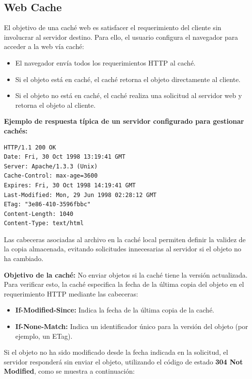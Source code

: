 \documentclass[a4paper,12pt]{article}
\begin{document}
\subsection{Web Cache}

El objetivo de una caché web es satisfacer el requerimiento del cliente sin involucrar al servidor destino. Para ello, el usuario configura el navegador para acceder a la web vía caché:

\begin{itemize}
    \item El navegador envía todos los requerimientos HTTP al caché.
    \item Si el objeto está en caché, el caché retorna el objeto directamente al cliente.
    \item Si el objeto no está en caché, el caché realiza una solicitud al servidor web y retorna el objeto al cliente.
\end{itemize}

\textbf{Ejemplo de respuesta típica de un servidor configurado para gestionar cachés:}

\begin{verbatim}
HTTP/1.1 200 OK
Date: Fri, 30 Oct 1998 13:19:41 GMT
Server: Apache/1.3.3 (Unix)
Cache-Control: max-age=3600
Expires: Fri, 30 Oct 1998 14:19:41 GMT
Last-Modified: Mon, 29 Jun 1998 02:28:12 GMT
ETag: "3e86-410-3596fbbc"
Content-Length: 1040
Content-Type: text/html
\end{verbatim}

Las cabeceras asociadas al archivo en la caché local permiten definir la validez de la copia almacenada, evitando solicitudes innecesarias al servidor si el objeto no ha cambiado.

\textbf{Objetivo de la caché:} No enviar objetos si la caché tiene la versión actualizada. Para verificar esto, la caché especifica la fecha de la última copia del objeto en el requerimiento HTTP mediante las cabeceras:

\begin{itemize}
    \item \textbf{If-Modified-Since:} Indica la fecha de la última copia de la caché.
    \item \textbf{If-None-Match:} Indica un identificador único para la versión del objeto (por ejemplo, un ETag).
\end{itemize}

Si el objeto no ha sido modificado desde la fecha indicada en la solicitud, el servidor responderá sin enviar el objeto, utilizando el código de estado \textbf{304 Not Modified}, como se muestra a continuación:
\end{document}
